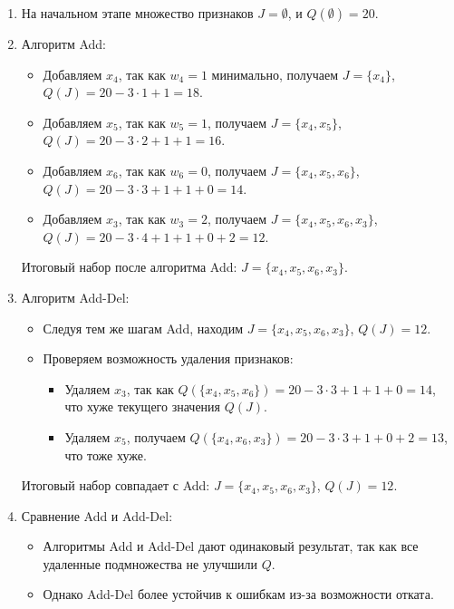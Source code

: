 \begin{enumerate}
    \item На начальном этапе множество признаков $J = \emptyset$, и $Q(\emptyset) = 20$.
    \item Алгоритм Add:
    \begin{itemize}
        \item Добавляем $x_4$, так как $w_4 = 1$ минимально, получаем $J = \{x_4\}$, $Q(J) = 20 - 3 \cdot 1 + 1 = 18$.
        \item Добавляем $x_5$, так как $w_5 = 1$, получаем $J = \{x_4, x_5\}$, $Q(J) = 20 - 3 \cdot 2 + 1 + 1 = 16$.
        \item Добавляем $x_6$, так как $w_6 = 0$, получаем $J = \{x_4, x_5, x_6\}$, $Q(J) = 20 - 3 \cdot 3 + 1 + 1 + 0 = 14$.
        \item Добавляем $x_3$, так как $w_3 = 2$, получаем $J = \{x_4, x_5, x_6, x_3\}$, $Q(J) = 20 - 3 \cdot 4 + 1 + 1 + 0 + 2 = 12$.
    \end{itemize}
    Итоговый набор после алгоритма Add: $J = \{x_4, x_5, x_6, x_3\}$.

    \item Алгоритм Add-Del:
    \begin{itemize}
        \item Следуя тем же шагам Add, находим $J = \{x_4, x_5, x_6, x_3\}$, $Q(J) = 12$.
        \item Проверяем возможность удаления признаков:
        \begin{itemize}
            \item Удаляем $x_3$, так как $Q(\{x_4, x_5, x_6\}) = 20 - 3 \cdot 3 + 1 + 1 + 0 = 14$, что хуже текущего значения $Q(J)$.
            \item Удаляем $x_5$, получаем $Q(\{x_4, x_6, x_3\}) = 20 - 3 \cdot 3 + 1 + 0 + 2 = 13$, что тоже хуже.
        \end{itemize}
    \end{itemize}
    Итоговый набор совпадает с Add: $J = \{x_4, x_5, x_6, x_3\}$, $Q(J) = 12$.
    
    \item Сравнение Add и Add-Del:
    \begin{itemize}
        \item Алгоритмы Add и Add-Del дают одинаковый результат, так как все удаленные подмножества не улучшили $Q$.
        \item Однако Add-Del более устойчив к ошибкам из-за возможности отката.
    \end{itemize}
\end{enumerate}

